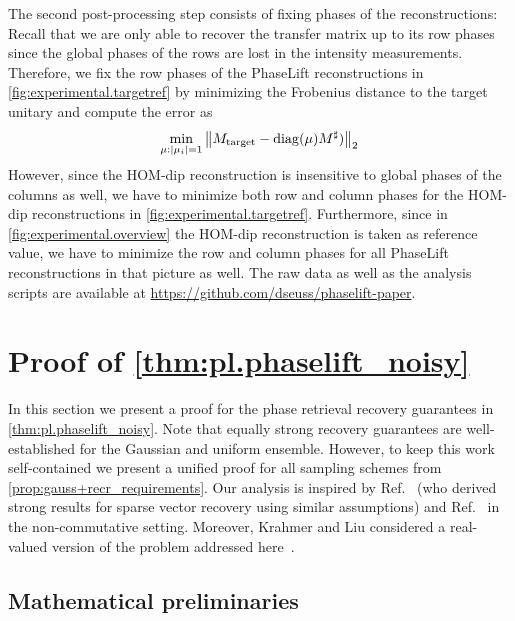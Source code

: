 The second post-processing step consists of fixing phases of the reconstructions:
Recall that we are only able to recover the transfer matrix up to its row phases since the global phases of the rows are lost in the intensity measurements.
Therefore, we fix the row phases of the PhaseLift reconstructions in \cref{fig:experimental.targetref} by minimizing the Frobenius distance to the target unitary and compute the error as
\[
  \min_{{\mu}: {\vert\mu_i\vert} = 1}\left\|  {M}_\mathrm{target} -  \mathrm{diag} ({\mu}) {M}^\sharp) \right\|_2
\]
However, since the HOM-dip reconstruction is insensitive to global phases of the columns as well, we have to minimize both row and column phases for the HOM-dip reconstructions in \cref{fig:experimental.targetref}.
Furthermore, since in \cref{fig:experimental.overview} the HOM-dip reconstruction is taken as reference value, we have to minimize the row and column phases for all PhaseLift reconstructions in that picture as well.
The raw data as well as the analysis scripts are available at \url{https://github.com/dseuss/phaselift-paper}.



\section{Proof of \cref{thm:pl.phaselift_noisy}}%
\label{sec:pl.main_proof}

In this section we present a proof for the phase retrieval recovery guarantees in \cref{thm:pl.phaselift_noisy}.
Note that equally strong recovery guarantees are well-established for the Gaussian and uniform ensemble\cite{Candes_2012_Solving,Demanet_2014_Stable}.
However, to keep this work self-contained we present a unified proof for all sampling schemes from \cref{prop:gauss+recr_requirements}.
Our analysis is inspired by Ref.~\cite{Dirksen_2017_On} (who derived strong results for sparse vector recovery using similar assumptions) and Ref.~\cite{Kabanava_2015_Stable} in the non-commutative setting.
Moreover, Krahmer and Liu considered a real-valued version of the problem addressed here~\cite{Krahmer_2018_Phase}.


\subsection{Mathematical preliminaries}

